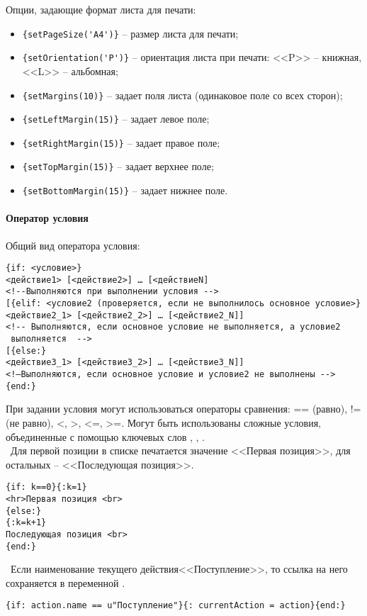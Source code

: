 Опции, задающие формат листа для печати:
\begin{itemize}
 \item \verb|{setPageSize('A4')}| – размер листа для печати;
 \item \verb|{setOrientation('P')}| – ориентация листа при печати: <<P>> – книжная, <<L>> – альбомная;
 \item \verb|{setMargins(10)}| – задает поля листа (одинаковое поле со всех сторон);
 \item \verb|{setLeftMargin(15)}| – задает левое поле;
 \item \verb|{setRightMargin(15)}| – задает правое поле;
 \item \verb|{setTopMargin(15)}| – задает верхнее поле;
 \item \verb|{setBottomMargin(15)}| – задает нижнее поле.
\end{itemize}

\paragraph{Оператор условия}

Общий вид оператора условия: 
\begin{verbatim}
{if: <условие>} 
<действие1> [<действие2>] … [<действиеN]
<!--Выполняются при выполнении условия --> 
[{elif: <условие2 (проверяется, если не выполнилось основное условие>} 
<действие2_1> [<действие2_2>] … [<действие2_N]] 		
<!-- Выполняются, если основное условие не выполняется, а условие2
 выполняется  --> 
[{else:} 
<действие3_1> [<действие3_2>] … [<действие3_N]] 	
<!—Выполняются, если основное условие и условие2 не выполнены --> 
{end:} 
\end{verbatim}

При задании условия могут использоваться операторы сравнения: == (равно), != (не равно), <, >, <=, >=. Могут быть использованы сложные условия, объединенные с помощью ключевых слов , , . \\

 ~Для первой позиции в списке печатается значение <<Первая позиция>>, для остальных – <<Последующая позиция>>.
\begin{verbatim}
{if: k==0}{:k=1} 
<hr>Первая позиция <br>
{else:}
{:k=k+1}
Последующая позиция <br>
{end:}
\end{verbatim}

 ~Если наименование текущего действия<<Поступление>>, то ссылка на него сохраняется в переменной .
\begin{verbatim}
{if: action.name == u"Поступление"}{: currentAction = action}{end:}
\end{verbatim}

